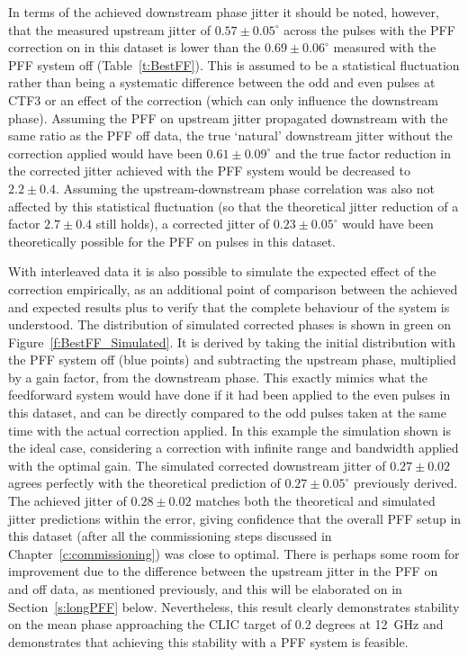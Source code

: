 In terms of the achieved downstream phase jitter it should be noted, however, that the 
measured upstream jitter of \(0.57\pm0.05^\circ\) across the pulses with the PFF 
correction on in this dataset is lower than the \(0.69\pm0.06^\circ\) measured with the 
PFF system off (Table~\ref{t:BestFF}). This is assumed to be a statistical fluctuation 
rather than being a systematic difference between the odd and even pulses at CTF3 or an 
effect of the correction (which can only influence the downstream phase). Assuming the 
PFF on upstream jitter propagated downstream with the same ratio as the PFF off data, 
the true `natural' downstream jitter without the correction applied would have been 
\(0.61\pm0.09^\circ\) and the true factor reduction in the corrected jitter achieved 
with the PFF system would be decreased to \(2.2\pm0.4\). Assuming the 
upstream-downstream phase correlation was also not affected by this statistical 
fluctuation (so that the theoretical jitter reduction of a factor \(2.7\pm0.4\) still 
holds), a corrected jitter of \(0.23\pm0.05^\circ\) would have been theoretically 
possible for the PFF on pulses in this dataset. 


With interleaved data it is also possible to simulate the expected effect of the 
correction empirically, as an additional point of comparison between the achieved and 
expected results plus to verify that the complete behaviour of the system is understood. 
The distribution of simulated corrected phases is shown in green on Figure~\ref{f:BestFF_Simulated}. 
It is derived by taking the initial distribution with the PFF 
system off (blue points) and subtracting the upstream phase, multiplied by a gain 
factor, from the downstream phase. This exactly mimics what the feedforward system would 
have done if it had been applied to the even pulses in this dataset, and can be directly
compared to the odd pulses taken at the same time with the actual correction applied. 
In this example the simulation shown is the ideal case, considering a correction with 
infinite range and bandwidth applied with the optimal gain. The simulated 
corrected downstream jitter of \(0.27\pm0.02\) agrees perfectly with the theoretical 
prediction of \(0.27\pm0.05^\circ\) previously derived. The achieved jitter of 
\(0.28\pm0.02\) matches both the theoretical and simulated jitter predictions within the error, 
giving confidence that the overall PFF setup in this dataset (after all the 
commissioning steps discussed in Chapter~\ref{c:commissioning}) was close to optimal. 
There is perhaps some room for improvement due to the difference between the upstream 
jitter in the PFF on and off data, as mentioned previously, and this will be elaborated 
on in Section~\ref{s:longPFF} below. Nevertheless, this result clearly demonstrates 
stability on the mean phase approaching the CLIC target of 0.2 degrees at 12~GHz and 
demonstrates that achieving this stability with a PFF system is feasible.



